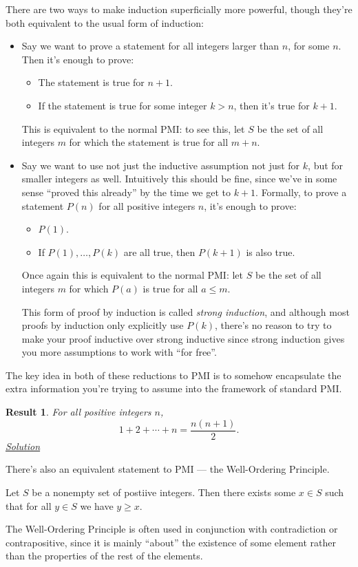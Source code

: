 \documentclass{amsart}
\newtheorem{result}{Result}[subsubsection]
\begin{document}
There are two ways to make induction superficially more powerful, though they're
both equivalent to the usual form of induction:
\begin{itemize}
  \item Say we want to prove a statement for all integers larger than $n$, for
    some $n$. Then it's enough to prove:
    \begin{itemize}
      \item The statement is true for $n+1$.
      \item If the statement is true for some integer $k>n$, then it's true for
        $k+1$.
    \end{itemize}
    This is equivalent to the normal PMI\@: to see this, let $S$ be the set of
    all integers $m$ for which the statement is true for all $m+n$.
  \item Say we want to use not just the inductive assumption not just for $k$,
    but for smaller integers as well. Intuitively this should be fine, since
    we've in some sense ``proved this already'' by the time we get to $k+1$.
    Formally, to prove a statement $P(n)$ for all positive integers $n$, it's
    enough to prove:
    \begin{itemize}
      \item $P(1)$.
      \item If $P(1),\ldots,P(k)$ are all true, then $P(k+1)$ is also true.
    \end{itemize}
    Once again this is equivalent to the normal PMI\@: let $S$ be the set of all
    integers $m$ for which $P(a)$ is true for all $a\le m$.

    This form of proof by induction is called \emph{strong induction}, and
    although most proofs by induction only explicitly use $P(k)$, there's no
    reason to try to make your proof inductive over strong inductive since
    strong induction gives you more assumptions to work with ``for free''.
\end{itemize}
The key idea in both of these reductions to PMI is to somehow encapsulate the
extra information you're trying to assume into the framework of standard PMI\@.
\begin{result}\label{r:b:m:4:1}
  For all positive integers $n$, \[1+2+\cdots+n=\frac{n(n+1)}2.\]
  \hyperlink{s:m:4:1}{Solution}
\end{result}

There's also an equivalent statement to PMI --- the Well-Ordering Principle.
\begin{tcolorbox}
  Let $S$ be a nonempty set of postiive integers. Then there exists some $x\in
  S$ such that for all $y\in S$ we have $y\ge x$.
\end{tcolorbox}
The Well-Ordering Principle is often used in conjunction with contradiction or
contrapositive, since it is mainly ``about'' the existence of some element
rather than the properties of the rest of the elements.
\end{document}

